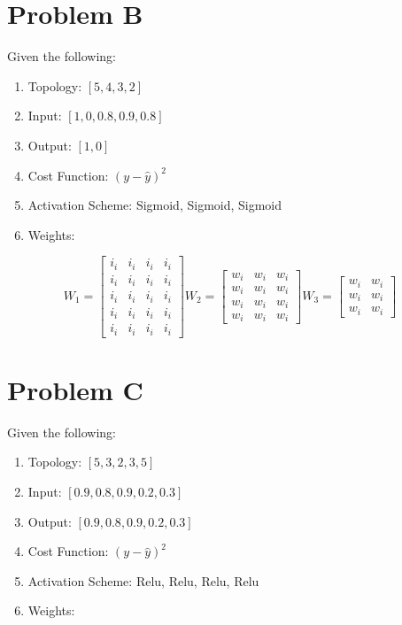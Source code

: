 \documentclass[a4paper]{article}
\begin{document}
\section{Problem B}

Given the following:

\begin{enumerate}
\item Topology: $[5, 4, 3, 2]$
\item Input: $[1, 0, 0.8, 0.9, 0.8]$
\item Output: $[1, 0]$
\item Cost Function: $(y - \widehat{y})^2$
\item Activation Scheme: Sigmoid, Sigmoid, Sigmoid
\item Weights:
\end{enumerate}


\begin{equation}
  W_{1}=\begin{bmatrix}
    i_{i} &   i_{i} & i_{i} & i_{i} \\
    i_{i} &   i_{i} & i_{i} & i_{i} \\
    i_{i} &   i_{i} & i_{i} & i_{i} \\
    i_{i} &   i_{i} & i_{i} & i_{i} \\
    i_{i} &   i_{i} & i_{i} & i_{i}
  \end{bmatrix}
  W_{2}=\begin{bmatrix}
    w_{i} &   w_{i} & w_{i} \\
    w_{i} &   w_{i} & w_{i} \\
    w_{i} &   w_{i} & w_{i} \\
    w_{i} &   w_{i} & w_{i}
  \end{bmatrix}
  W_{3}=\begin{bmatrix}
    w_{i} &   w_{i} \\
    w_{i} &   w_{i} \\
    w_{i} &   w_{i}
  \end{bmatrix}
\end{equation}

\section{Problem C}

Given the following:

\begin{enumerate}
\item Topology: $[5, 3, 2, 3, 5]$
\item Input: $[0.9, 0.8, 0.9, 0.2, 0.3]$
\item Output: $[0.9, 0.8, 0.9, 0.2, 0.3]$
\item Cost Function: $(y - \widehat{y})^2$
\item Activation Scheme: Relu, Relu, Relu, Relu
\item Weights:
\end{enumerate}
\end{document}
